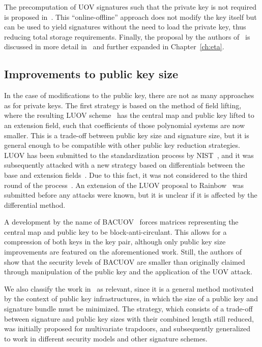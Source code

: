 \documentclass[12pt, a4paper, oneside]{memoir}
\theoremstyle{definition}
\begin{document}
The precomputation of UOV signatures such that the private key is not required is proposed in~\cite{Chen:201603}. This ``online-offline'' approach does not modify the key itself but can be used to yield signatures without the need to load the private key, thus reducing total storage requirements. Finally, the proposal by the authors of~\cite{Zambonin:201907} is discussed in more detail in~\cite{Bittencourt:201911} and further expanded in Chapter~\ref{ch:eta}.

\subsection{Improvements to public key size}\label{subsec:pub}

In the case of modifications to the public key, there are not as many approaches as for private keys. The first strategy is based on the method of field lifting, where the resulting LUOV scheme~\cite{Beullens:201712} has the central map and public key lifted to an extension field, such that coefficients of those polynomial systems are now smaller. This is a trade-off between public key size and signature size, but it is general enough to be compatible with other public key reduction strategies. LUOV has been submitted to the standardization process by NIST~\cite{Alagic:201901}, and it was subsequently attacked with a new strategy based on differentials between the base and extension fields~\cite{Ding:201912}. Due to this fact, it was not considered to the third round of the process~\cite[Section~3.24]{Alagic:202007}. An extension of the LUOV proposal to Rainbow~\cite{Duong:202003} was submitted before any attacks were known, but it is unclear if it is affected by the differential method.

A development by the name of BACUOV~\cite{Szepieniec:201908} forces matrices representing the central map and public key to be block-anti-circulant. This allows for a compression of both keys in the key pair, although only public key size improvements are featured on the aforementioned work. Still, the authors of~\cite{Furue:202004} show that the security levels of BACUOV are smaller than originally claimed through manipulation of the public key and the application of the UOV attack.

We also classify the work in~\cite{Szepieniec:201706} as relevant, since it is a general method motivated by the context of public key infrastructures, in which the size of a public key and signature bundle must be minimized. The strategy, which consists of a trade-off between signature and public key sizes with their combined length still reduced, was initially proposed for multivariate trapdoors, and subsequently generalized~\cite{Beullens:201808} to work in different security models and other signature schemes.
\end{document}
